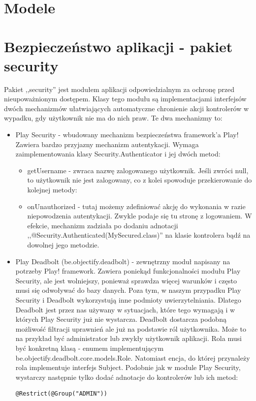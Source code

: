\documentclass[a4paper,12pt,notitlepage]{mwrep}
\begin{document}
\section{Modele}

\section{Bezpieczeństwo aplikacji - pakiet security}

Pakiet ,,security'' jest modułem aplikacji odpowiedzialnym za ochronę przed nieupoważnionym dostępem. Klasy tego modułu są implementacjami interfejsów dwóch mechanizmów ułatwiających automatyczne chronienie akcji kontrolerów w wypadku, gdy użytkownik nie ma do nich praw. Te dwa mechanizmy to:
\begin{itemize}
	\item	Play Security - wbudowany mechanizm bezpieczeństwa framework'a Play! Zawiera bardzo przyjazny mechanizm autentykacji. Wymaga zaimplementowania klasy Security.Authenticator i jej dwóch metod:
	\begin{itemize}
		\item	getUsername - zwraca nazwę zalogowanego użytkownik. Jeśli zwróci null, to użytkownik nie jest zalogowany, co z kolei spowoduje przekierowanie do kolejnej metody: 
		\item	onUnauthorized - tutaj możemy zdefiniować akcję do wykonania w razie niepowodzenia autentykacji. Zwykle podaje się tu stronę z logowaniem. W efekcie, mechanizm zadziała po dodaniu adnotacji ,,@Security.Authenticated(MySecured.class)'' na klasie kontrolera bądź na dowolnej jego metodzie.
	\end{itemize}	
	\item	Play Deadbolt (be.objectify.deadbolt) - zewnętrzny moduł napisany na potrzeby Play! framework. Zawiera poniekąd funkcjonalności modułu Play Security, ale jest wolniejszy, ponieważ sprawdza więcej warunków i często musi się odwoływać do bazy danych. Poza tym, w naszym przypadku Play Security i Deadbolt wykorzystują inne podmioty uwierzytelniania. Dlatego Deadbolt jest przez nas używany w sytuacjach, które tego wymagają i w których Play Security już nie wystarcza. Deadbolt dostarcza podobną możliwość filtracji uprawnień ale już na podstawie ról użytkownika. Może to na przykład być administrator lub zwykły użytkownik aplikacji. Rola musi być konkretną klasą - enumem implementującym be.objectify.deadbolt.core.models.Role. Natomiast encja, do której przynależy rola implementuje interfejs Subject. Podobnie jak w module Play Security, wystarczy następnie tylko dodać adnotacje do kontrolerów lub ich metod: \begin{verbatim}@Restrict(@Group("ADMIN"))\end{verbatim}
\end{itemize}
\end{document}
